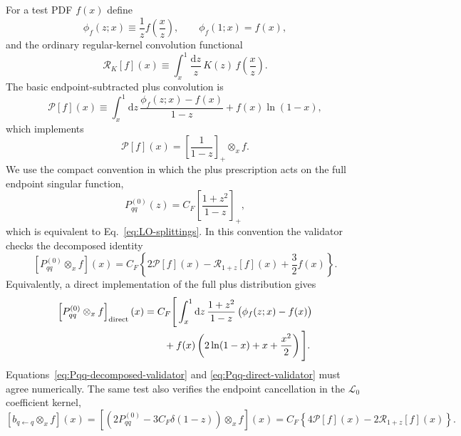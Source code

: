 \documentclass[11pt]{article}
\newcommand{\dd}{\mathrm{d}}
\newcommand{\ox}{\otimes_x}
\begin{document}
For a test PDF $f(x)$ define
\begin{equation}
  \phi_f(z;x)\equiv \frac{1}{z}f\!\left(\frac{x}{z}\right),
  \qquad
  \phi_f(1;x)=f(x),
  \label{eq:phi-test-pdf}
\end{equation}
and the ordinary regular-kernel convolution functional
\begin{equation}
  \mathcal R_K[f](x)
  \equiv
  \int_x^1 \frac{\dd z}{z}\,K(z)\,f\!\left(\frac{x}{z}\right).
  \label{eq:R-K-functional}
\end{equation}
The basic endpoint-subtracted plus convolution is
\begin{equation}
  \mathcal P[f](x)
  \equiv
  \int_x^1 \dd z\,
  \frac{\phi_f(z;x)-f(x)}{1-z}
  +f(x)\ln(1-x),
  \label{eq:P-plus-functional}
\end{equation}
which implements
\begin{equation}
  \mathcal P[f](x)
  =
  \left[\frac{1}{1-z}\right]_+\ox f .
  \label{eq:P-plus-meaning}
\end{equation}
We use the compact convention in which the plus prescription acts on the full endpoint
singular function,
\begin{equation}
  P_{qq}^{(0)}(z)
  =C_F\left[\frac{1+z^2}{1-z}\right]_+,
  \label{eq:Pqq-full-plus-validator}
\end{equation}
which is equivalent to Eq.~\eqref{eq:LO-splittings}. In this convention the validator
checks the decomposed identity
\begin{equation}
  \left[P_{qq}^{(0)}\ox f\right](x)
  =
  C_F\left\{2\mathcal P[f](x)-\mathcal R_{1+z}[f](x)+\frac{3}{2}f(x)\right\}.
  \label{eq:Pqq-decomposed-validator}
\end{equation}
Equivalently, a direct implementation of the full plus distribution gives
\begin{align}
  \left[P_{qq}^{(0)}\ox f\right]_{\rm direct}(x)
  &=
  C_F\Bigg[
  \int_x^1 \dd z\,
  \frac{1+z^2}{1-z}\,\bigl(\phi_f(z;x)-f(x)\bigr)
  \notag\\
  &\qquad
  +f(x)\left(2\ln(1-x)+x+\frac{x^2}{2}\right)
  \Bigg].
  \label{eq:Pqq-direct-validator}
\end{align}
Equations~\eqref{eq:Pqq-decomposed-validator} and
\eqref{eq:Pqq-direct-validator} must agree numerically. The same test also verifies the
endpoint cancellation in the $\mathcal L_0$ coefficient kernel,
\begin{equation}
  \left[b_{q\leftarrow q}\ox f\right](x)
  =
  \left[(2P_{qq}^{(0)}-3C_F\delta(1-z))\ox f\right](x)
  =
  C_F\left\{4\mathcal P[f](x)-2\mathcal R_{1+z}[f](x)\right\}.
  \label{eq:bqq-endpoint-cancel-validator}
\end{equation}
\end{document}
